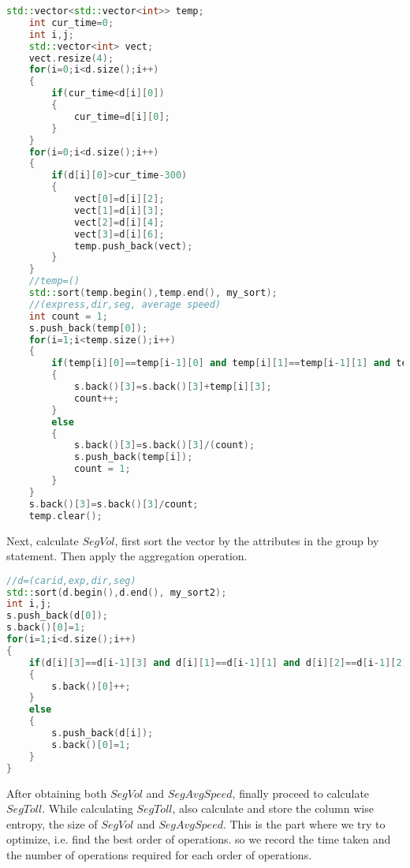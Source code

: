 \begin{lstlisting}[language=C++]
    std::vector<std::vector<int>> temp;
    int cur_time=0;
    int i,j;
    std::vector<int> vect;
    vect.resize(4);
    for(i=0;i<d.size();i++)
    {
        if(cur_time<d[i][0])
        {
            cur_time=d[i][0];
        }
    }
    for(i=0;i<d.size();i++)
    {
        if(d[i][0]>cur_time-300)
        {
            vect[0]=d[i][2];
            vect[1]=d[i][3];
            vect[2]=d[i][4];
            vect[3]=d[i][6];
            temp.push_back(vect);
        }
    }
    //temp=()
    std::sort(temp.begin(),temp.end(), my_sort);
    //(express,dir,seg, average speed)
    int count = 1;
    s.push_back(temp[0]);
    for(i=1;i<temp.size();i++)
    {
        if(temp[i][0]==temp[i-1][0] and temp[i][1]==temp[i-1][1] and temp[i][2]==temp[i-1][2])
        {
            s.back()[3]=s.back()[3]+temp[i][3];
            count++;
        }
        else
        {
            s.back()[3]=s.back()[3]/(count);
            s.push_back(temp[i]);
            count = 1;
        }
    }
    s.back()[3]=s.back()[3]/count;
    temp.clear();
\end{lstlisting}
Next, calculate $SegVol$, first sort the vector by the attributes in the group by statement. Then apply the aggregation operation.
\begin{lstlisting}[language=C++]
//d=(carid,exp,dir,seg)
std::sort(d.begin(),d.end(), my_sort2);
int i,j;
s.push_back(d[0]);
s.back()[0]=1;
for(i=1;i<d.size();i++)
{
    if(d[i][3]==d[i-1][3] and d[i][1]==d[i-1][1] and d[i][2]==d[i-1][2])
    {
        s.back()[0]++;
    }
    else
    {
        s.push_back(d[i]);
        s.back()[0]=1;
    }
}
\end{lstlisting}
After obtaining both $SegVol$ and $SegAvgSpeed$, finally proceed to calculate $SegToll$. While calculating $SegToll$, also calculate and store the column wise entropy, the size of $SegVol$ and $SegAvgSpeed$. This is the part where we try to optimize, i.e. find the best order of operations. so we record the time taken and the number of operations required for each order of operations.
